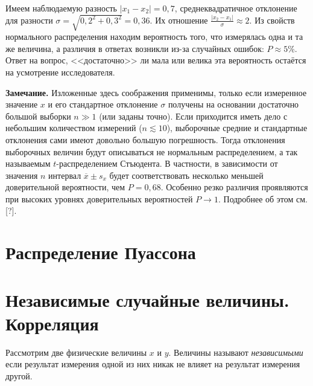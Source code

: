 {\footnotesize{}Имеем наблюдаемую разность $\left|x_{1}-x_{2}\right|=0{,}7$,
среднеквадратичное отклонение для разности $\sigma=\sqrt{0{,}2^{2}+0{,}3^{2}}=0{,}36$.
Их отношение $\frac{\left|x_{2}-x_{1}\right|}{\sigma}\approx2$. Из
свойств нормального распределения находим вероятность того, что измерялась
одна и та же величина, а различия в ответах возникли из-за случайных
ошибок: $P\approx5\%$. Ответ на вопрос, <<достаточно>>
ли мала или велика эта вероятность остаётся на усмотрение исследователя.}{\footnotesize\par}

\textbf{\footnotesize{}Замечание.}{\footnotesize{} Изложенные здесь
соображения применимы, только если измеренное значение $x$ и его
стандартное отклонение $\sigma$ получены на основании достаточно
большой выборки $n\gg1$ (или заданы точно). Если приходится иметь
дело с небольшим количеством измерений ($n\lesssim10$), выборочные
средние и стандартные отклонения сами имеют довольно большую погрешность.
Тогда отклонения выборочных величин будут описываться не нормальным
распределением, а так называемым $t$-распределением Стъюдента. В
частности, в зависимости от значения $n$ интервал $\overline{x}\pm s_{x}$
будет соответствовать несколько меньшей доверительной вероятности,
чем $P=0{,}68$. Особенно резко различия проявляются при высоких уровнях
доверительных вероятностей $P\to1$. Подробнее об этом см. {[}?{]}.}{\footnotesize\par}

\section{Распределение Пуассона}

\section{Независимые случайные величины. Корреляция}

Рассмотрим две физические величины $x$ и $y$. Величины называют
\emph{независимыми} если результат измерения одной из них никак не
влияет на результат измерения другой.

